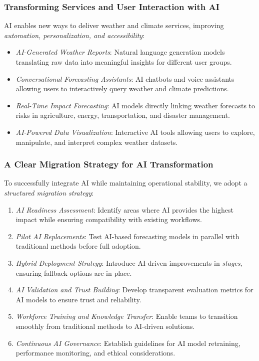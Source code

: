 \subsubsection{Transforming Services and User Interaction with AI}
AI enables new ways to deliver weather and climate services, improving \emph{automation, personalization, and accessibility}:
\begin{itemize}[itemsep=1pt,topsep=3pt]
    \item \emph{AI-Generated Weather Reports}: Natural language generation models translating raw data into meaningful insights for different user groups.
    \item \emph{Conversational Forecasting Assistants}: AI chatbots and voice assistants allowing users to interactively query weather and climate predictions.
    \item \emph{Real-Time Impact Forecasting}: AI models directly linking weather forecasts to risks in agriculture, energy, transportation, and disaster management.
    \item \emph{AI-Powered Data Visualization}: Interactive AI tools allowing users to explore, manipulate, and interpret complex weather datasets.
\end{itemize}

\subsubsection{A Clear Migration Strategy for AI Transformation}
To successfully integrate AI while maintaining operational stability, we adopt a \emph{structured migration strategy}:
\begin{enumerate}[itemsep=1pt,topsep=3pt]
    \item \emph{AI Readiness Assessment}: Identify areas where AI provides the highest impact while ensuring compatibility with existing workflows.
    \item \emph{Pilot AI Replacements}: Test AI-based forecasting models in parallel with traditional methods before full adoption.
    \item \emph{Hybrid Deployment Strategy}: Introduce AI-driven improvements in \emph{stages}, ensuring fallback options are in place.
    \item \emph{AI Validation and Trust Building}: Develop transparent evaluation metrics for AI models to ensure trust and reliability.
    \item \emph{Workforce Training and Knowledge Transfer}: Enable teams to transition smoothly from traditional methods to AI-driven solutions.
    \item \emph{Continuous AI Governance}: Establish guidelines for AI model retraining, performance monitoring, and ethical considerations.
\end{enumerate}


